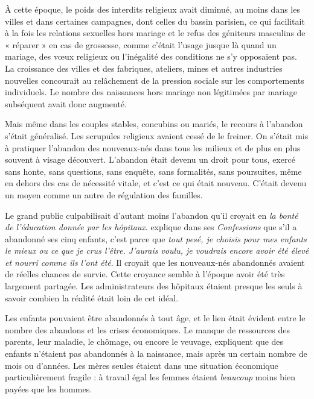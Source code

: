  À cette époque, le poids des interdits religieux avait diminué, au moins dans les villes et dans certaines campagnes, dont celles du bassin parisien, ce qui facilitait à la fois les relations sexuelles hors mariage et le refus des géniteurs masculins de « réparer » en cas de grossesse, comme c'était l'usage jusque là quand un mariage, des vœux religieux ou l'inégalité des conditions ne s'y opposaient pas. La croissance des villes et des fabriques, ateliers, mines et autres industries nouvelles concourait au relâchement de la pression sociale sur les comportements individuels. Le nombre des naissances hors mariage non légitimées par mariage subséquent avait donc augmenté. 

 Mais même dans les couples stables, concubins ou mariés, le recours à l'abandon s'était généralisé. Les scrupules religieux avaient cessé de le freiner. On s'était mis à pratiquer l'abandon des nouveaux-nés dans tous les milieux et de plus en plus souvent à visage découvert. L'abandon était devenu un droit pour tous, exercé sans honte, sans questions, sans enquête, sans formalités, sans poursuites, même en dehors des cas de nécessité vitale, et c'est ce qui était nouveau. C'était devenu un moyen comme un autre de régulation des familles. 

 Le grand public culpabilisait d'autant moins l'abandon qu'il croyait en \emph{la bonté de l'éducation donnée par les hôpitaux}.  explique dans ses \emph{Confessions} que s'il a abandonné ses cinq enfants, c'est parce que \emph{tout pesé, je choisis pour mes enfants le mieux ou ce que je crus l'être. J'aurais voulu, je voudrais encore avoir été élevé et nourri comme ils l'ont été}. Il croyait que les nouveaux-nés abandonnés avaient de réelles chances de survie. Cette croyance semble à l'époque avoir été très largement partagée. Les administrateurs des hôpitaux étaient presque les seuls à savoir combien la réalité était loin de cet idéal. 

 Les enfants pouvaient être abandonnés à tout âge, et le lien était évident entre le nombre des abandons et les crises économiques. Le manque de ressources des parents, leur maladie, le chômage, ou encore le veuvage, expliquent que des enfants n'étaient pas abandonnés à la naissance, mais après un certain nombre de mois ou d'années. Les mères seules étaient dans une situation économique particulièrement fragile : à travail égal les femmes étaient \emph{beaucoup} moins bien payées que les hommes. 

